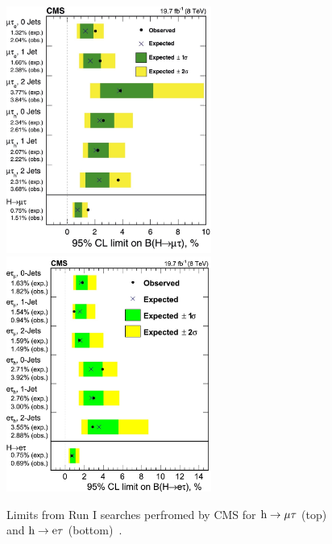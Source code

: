 \begin{figure}[hbtp]
 \begin{center}
   \includegraphics[width=0.6\textwidth]{plots_and_figures/chapter2/mutau_limits.jpg}\\
   \includegraphics[width=0.6\textwidth]{plots_and_figures/chapter2/etau_limits.jpg}
   \caption{Limits from Run I searches perfromed by CMS for $\text{h} \to \mu \tau$ (top) and $\text{h} \to \text{e} \tau$ (bottom)~\cite{Khachatryan:2015kon,HIG-14-040}.}
   \label{fig:8tev_limits}
 \end{center}
\end{figure}


